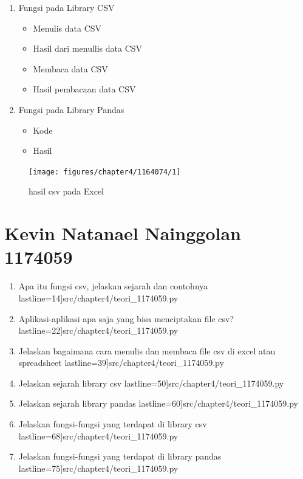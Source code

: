 \begin{enumerate}
\item Fungsi pada Library CSV
\begin{itemize}
\item Menulis data CSV

\item Hasil dari menullis data CSV

\item Membaca data CSV

\item Hasil pembacaan data CSV

\end{itemize}

\item Fungsi pada Library Pandas
\begin{itemize}
\item Kode

\item Hasil

\end{itemize}
\end{enumerate}

\begin{figure}[!htbp]
	\centering
	\texttt{[image: figures/chapter4/1164074/1]}
	\caption{hasil csv pada Excel}
	\label{fig1}
\end{figure}

\section {Kevin Natanael Nainggolan 1174059}
	\begin {enumerate}
		\item Apa itu fungsi csv, jelaskan sejarah dan contohnya 
			 lastline=14]{src/chapter4/teori_1174059.py}
		\item Aplikasi-aplikasi apa saja yang bisa menciptakan file csv? 
			 lastline=22]{src/chapter4/teori_1174059.py}
		\item Jelaskan bagaimana cara menulis dan membaca file csv di excel atau spreadsheet
			 lastline=39]{src/chapter4/teori_1174059.py}
		\item Jelaskan sejarah library csv
			 lastline=50]{src/chapter4/teori_1174059.py}
		\item Jelaskan sejarah library pandas
			 lastline=60]{src/chapter4/teori_1174059.py}
		\item Jelaskan fungsi-fungsi yang terdapat di library csv
			 lastline=68]{src/chapter4/teori_1174059.py}
		\item Jelaskan fungsi-fungsi yang terdapat di library pandas
			 lastline=75]{src/chapter4/teori_1174059.py}
	\end {enumerate}

